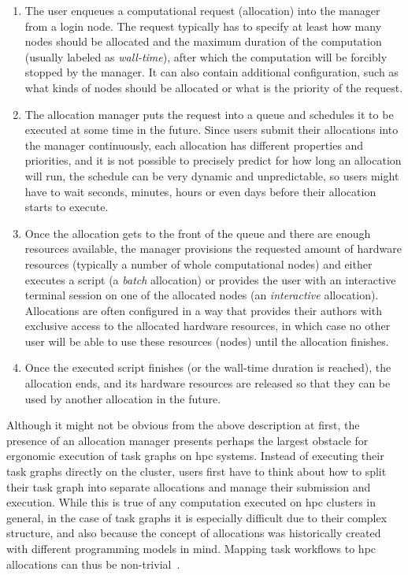 \begin{enumerate}
	\item The user enqueues a computational request (allocation) into the manager from a login node. The
	      request typically has to specify at least how many nodes should be allocated and the maximum
	      duration of the computation (usually labeled as \emph{wall-time}), after which the
	      computation will be forcibly stopped by the manager. It can also contain additional configuration,
	      such as what kinds of nodes should be allocated or what is the priority of the request.
	\item The allocation manager puts the request into a queue and schedules it to be executed at some time
	      in the future. Since users submit their allocations into the manager continuously, each allocation
	      has different properties and priorities, and it is not possible to precisely predict for how long
	      an allocation will run, the schedule can be very dynamic and unpredictable, so users might have to
	      wait seconds, minutes, hours or even days before their allocation starts to execute.
	\item Once the allocation gets to the front of the queue and there are enough resources available, the
	      manager provisions the requested amount of hardware resources (typically a number of whole
	      computational nodes) and either executes a script (a \emph{batch} allocation) or provides
	      the user with an interactive terminal session on one of the allocated nodes (an
	      \emph{interactive} allocation). Allocations are often configured in a way that provides their
	      authors with exclusive access to the allocated hardware resources, in which case no other user will
	      be able to use these resources (nodes) until the allocation finishes.
	\item Once the executed script finishes (or the wall-time duration is reached), the allocation ends, and
	      its hardware resources are released so that they can be used by another allocation in the future.
\end{enumerate}

Although it might not be obvious from the above description at first, the presence of an allocation
manager presents perhaps the largest obstacle for ergonomic execution of task graphs on
\gls{hpc} systems. Instead of executing their task graphs directly on the cluster,
users first have to think about how to split their task graph into separate allocations and manage
their submission and execution. While this is true of any computation executed on
\gls{hpc} clusters in general, in the case of task graphs it is especially difficult
due to their complex structure, and also because the concept of allocations was historically
created with different programming models in mind. Mapping task workflows to
\gls{hpc} allocations can thus be non-trivial~\cite{glume,slurm-workflow}.

